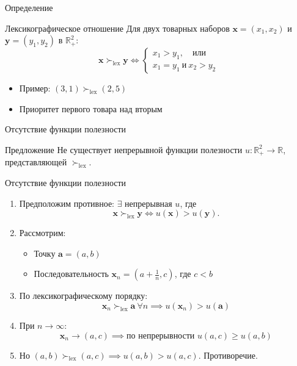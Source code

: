 \documentclass{beamer}
\begin{document}
\begin{frame}{Определение}
\begin{block}{Лексикографическое отношение}
Для двух товарных наборов \(\mathbf{x} = (x_1, x_2)\) и \(\mathbf{y} = (y_1, y_2)\) в \(\mathbb{R}^2_+\):
\[
\mathbf{x} \succ_{\text{lex}} \mathbf{y} \iff 
\begin{cases}
x_1 > y_1, \quad \text{или} \\
x_1 = y_1 \ \text{и} \ x_2 > y_2
\end{cases}
\]
\end{block}

\begin{itemize}
\item Пример: \((3, 1) \succ_{\text{lex}} (2, 5)\)
\item Приоритет первого товара над вторым
\end{itemize}
\end{frame}

\begin{frame}{Отсутствие функции полезности}
\begin{block}{Предложение}
Не существует непрерывной функции полезности \(u: \mathbb{R}^2_+ \to \mathbb{R}\), представляющей \(\succ_{\text{lex}}\).
\end{block}


\end{frame}


\begin{frame}{Отсутствие функции полезности}

\renewcommand{\qedsymbol}{}
\begin{enumerate}
\item Предположим противное: \(\exists\) непрерывная \(u\), где 
\[
\mathbf{x} \succ_{\text{lex}} \mathbf{y} \iff u(\mathbf{x}) > u(\mathbf{y}).
\]

\item Рассмотрим:
\begin{itemize}
\item Точку \(\mathbf{a} = (a, b)\)
\item Последовательность \(\mathbf{x}_n = (a + \frac{1}{n}, c)\), где \(c < b\)
\end{itemize}

\item По лексикографическому порядку:
\[
\mathbf{x}_n \succ_{\text{lex}} \mathbf{a} \ \forall n \implies u(\mathbf{x}_n) > u(\mathbf{a})
\]

\item При \(n \to \infty\): 
\[
\mathbf{x}_n \to (a, c) \implies \text{по непрерывности } u(a, c) \geq u(a, b)
\]
\item Но \((a, b) \succ_{\text{lex}} (a, c) \implies u(a, b) > u(a, c)\). Противоречие.
\end{enumerate}
\end{frame}
\end{document}
